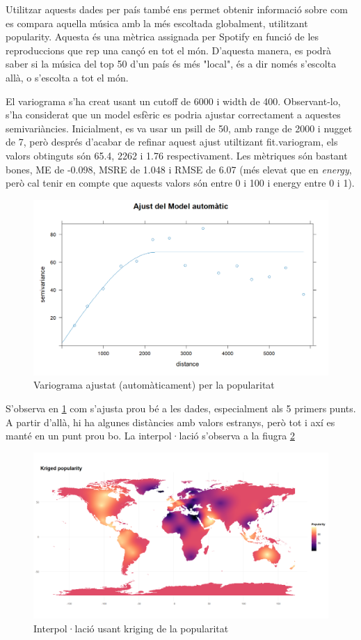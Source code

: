 Utilitzar aquests dades per país també ens permet obtenir informació sobre com es compara aquella música amb la més escoltada globalment, utilitzant popularity. Aquesta és una mètrica assignada per Spotify en funció de les reproduccions que rep una cançó en tot el món. D'aquesta manera, es podrà saber si la música del top 50 d'un país és més "local", és a dir només s'escolta allà, o s'escolta a tot el món.

El variograma s'ha creat usant un cutoff de 6000 i width de 400. Observant-lo, s'ha considerat que un model esfèric es podria ajustar correctament a aquestes semivariàncies. Inicialment, es va usar un psill de 50, amb range de 2000 i nugget de 7, però després d'acabar de refinar aquest ajust utiltizant fit.variogram, els valors obtinguts són 65.4, 2262 i 1.76 respectivament. Les mètriques són bastant bones, ME de -0.098, MSRE de 1.048 i RMSE de 6.07 (més elevat que en \textit{energy}, però cal tenir en compte que aquests valors són entre 0 i 100 i energy entre 0 i 1).

\begin{figure}[H]
    \centering
    \includegraphics[width=0.5\linewidth]{Images//7_Geospatial//3_new/variogram_fit_popularity.png}
    \caption{Variograma ajustat (automàticament) per la popularitat}
    \label{fig:geo_new_pop_variogram}
\end{figure}

S'observa en \ref{fig:geo_new_pop_variogram} com s'ajusta prou bé a les dades, especialment als 5 primers punts. A partir d'allà, hi ha algunes distàncies amb valors estranys, però tot i axí es manté en un punt prou bo. La interpol·lació s'observa a la fiugra \ref{fig:geo_new_pop_interpol}

\begin{figure}[H]
    \centering
    \includegraphics[width=0.8\linewidth]{Images//7_Geospatial//3_new/popularity_interpolation.png}
    \caption{Interpol·lació usant kriging de la popularitat}
    \label{fig:geo_new_pop_interpol}
\end{figure}

